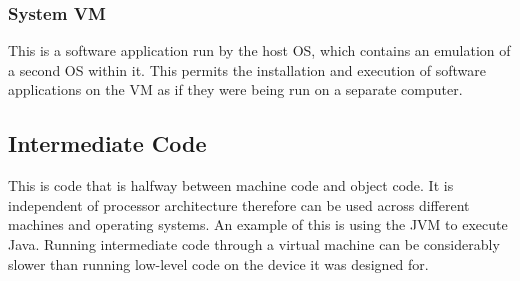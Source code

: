 \documentclass[a4paper,11pt, twocolumn]{article}
\begin{document}
\subsubsection{System VM}
This is a software application run by the host OS, which contains an emulation of a second OS within it. This permits the installation and execution of software applications on the VM as if they were being run on a separate computer.   
\subsection{Intermediate Code}
This is code that is halfway between machine code and object code. It is independent of processor architecture therefore can be used across different machines and operating systems. An example of this is using the JVM to execute Java. Running intermediate code through a virtual machine can be considerably slower than running low-level code on the device it was designed for.
\end{document}
